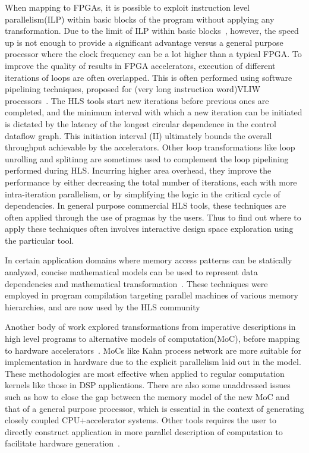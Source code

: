 When mapping to FPGAs, it is possible to exploit instruction level parallelism(ILP) within basic blocks of the program without
applying any transformation. Due to the limit of ILP within basic blocks~\cite{Wall:1991:LIP:106972.106991}, however, the speed up 
is not enough to provide a significant advantage versus a general purpose processor where the clock frequency
can be a lot higher than a typical FPGA. To improve the quality of results in FPGA accelerators, execution of different iterations of loops are often overlapped. This is often  performed using software pipelining techniques,
proposed for (very long instruction word)VLIW processors~\cite{Lam:1988:SPE:53990.54022}\cite{Rau:1994:IMS:192724.192731}\cite{Tirumalai:1990:PLE:110382.110438}\cite{Allan:1995:SP:212094.212131}\cite{Ebcioglu:1987:CTS:255305.255317}.  The HLS tools start new iterations before previous ones are completed, and the minimum interval with which a new iteration can be initiated is dictated by the latency of the longest circular dependence in the control dataflow graph. This initiation interval (II) ultimately bounds the overall throughput achievable by the accelerators. Other loop transformations like loop unrolling and splitinng are sometimes used to complement the loop pipelining performed during HLS. Incurring higher area overhead, they improve the performance by either decreasing the total number of iterations, each with more intra-iteration parallelism, or by simplifying the logic in the critical cycle of dependencies. In general purpose commercial HLS tools, these techniques are often applied through
the use of pragmas by the users. Thus to find out where to apply these
techniques often involves interactive design space exploration using the particular
tool.

In certain application domains where memory access patterns
can be statically analyzed, concise mathematical models can be used to represent data dependencies and mathematical 
transformation~\cite{Ancourt:1991:SPL:109625.109631}\cite{putpolyd2work}\cite{polymorewidely}\cite{girbal2006semi}\cite{pugh1991uniform}\cite{wolf1991loop}. These techniques were employed in program compilation targeting parallel machines of various memory hierarchies\cite{feautrier1988semantical}\cite{}, and are now used by the HLS community~\cite{Zuo:2013:IPC}\cite{Pouchet:2013}\cite{}


Another body of work explored transformations from imperative descriptions in
high level programs to alternative models of computation(MoC), before mapping to
hardware accelerators~\cite{mat2pn}\cite{c2stream}. MoCs like Kahn process network
are more suitable for implementation in hardware due to the explicit parallelism laid out
in the model. These methodologies are most effective when applied to regular computation kernels
like those in DSP applications. There are also some unaddressed issues 
such as how to close the gap
between the memory model of the new MoC and that of a
general purpose processor, which is essential in the context of
generating closely coupled CPU+accelerator systems.
Other tools requires the user to directly construct application
in more parallel description of computation to facilitate hardware
generation~\cite{hlfp}\cite{MARC}. 

